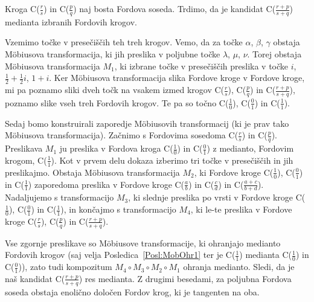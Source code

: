 \documentclass[mat1]{fmfdelo}
\begin{document}
\begin{dokaz}
Kroga C($\frac{r}{s}$) in C($\frac{p}{q}$) naj bosta Fordova soseda. Trdimo, da je kandidat C($\frac{r+p}{s+q}$) medianta izbranih Fordovih krogov.

Vzemimo točke v presečiščih teh treh krogov. Vemo, da za točke $\alpha$, $\beta$, $\gamma$ obstaja M\"{o}biusova transformacija, ki jih preslika v poljubne točke $\lambda$, $\mu$, $\nu$. Torej obstaja M\"{o}biusova transformacija $M_{1}$, ki izbrane točke v presečiščih preslika v točke $i$, $\frac{1}{2}+\frac{1}{2}i$, $1+i$. Ker M\"{o}biusova transformacija slika Fordove kroge v Fordove kroge, mi pa poznamo sliki dveh točk na vsakem izmed krogov C($\frac{r}{s}$), C($\frac{p}{q}$) in C($\frac{r+p}{s+q}$), poznamo slike vseh treh Fordovih krogov. Te pa so točno C($\frac{1}{0}$), C($\frac{0}{1}$) in C($\frac{1}{1}$).

Sedaj bomo konstruirali zaporedje M\"{o}biusovih transformacij (ki je prav tako M\"{o}biusova transformacija). Začnimo s Fordovima sosedoma C($\frac{r}{s}$) in C($\frac{p}{q}$). Preslikava $M_{1}$ ju preslika v Fordova kroga C($\frac{1}{0}$) in C($\frac{0}{1}$) z medianto, Fordovim krogom, C($\frac{1}{1}$). Kot v prvem delu dokaza izberimo tri točke v presečiščih in jih preslikajmo. Obstaja M\"{o}biusova transformacija $M_{2}$, ki Fordove kroge C($\frac{1}{0}$), C($\frac{0}{1}$) in C($\frac{1}{1}$) zaporedoma preslika v Fordove kroge C($\frac{a}{b}$) in C($\frac{c}{d}$) in C($\frac{a+c}{b+d}$). Nadaljujemo s transformacijo $M_{3}$, ki slednje preslika po vrsti v Fordove kroge C($\frac{1}{0}$), C($\frac{0}{1}$) in C($\frac{1}{1}$), in končajmo s transformacijo $M_{4}$, ki le-te preslika v Fordove kroge C($\frac{r}{s}$), C($\frac{p}{q}$) in C($\frac{r+p}{s+q}$).

Vse zgornje preslikave so M\"{o}biusove transformacije, ki ohranjajo medianto Fordovih krogov (saj velja Posledica~\ref{Posl:MobOhr1} ter je C($\frac{1}{1}$) medianta C($\frac{1}{0}$) in C($\frac{0}{1}$)), zato tudi kompozitum $M_{4} \circ M_{3} \circ M_{2} \circ M_{1}$ ohranja medianto. Sledi, da je naš kandidat C($\frac{r+p}{s+q}$) res medianta. Z drugimi besedami, za poljubna Fordova soseda obstaja enolično določen Fordov krog, ki je tangenten na oba.
\end{dokaz}

%
\end{document}

